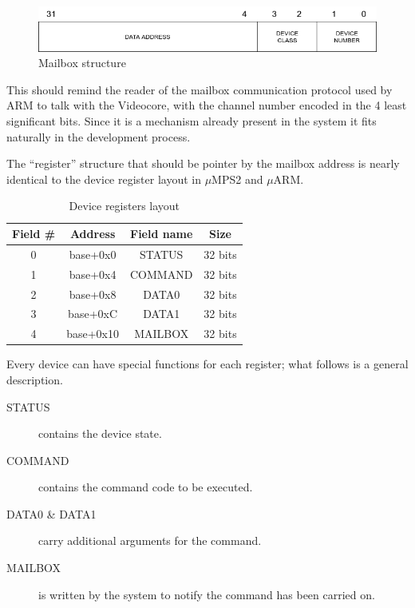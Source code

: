 \documentclass[12pt,a4paper,openright,twoside]{report}
\begin{document}
\begin{figure}[h]
\includegraphics[scale=0.571]{images/tesi5.png}
\caption[Mailbox Structure]{Mailbox structure}\label{fig:mailbox}
\end{figure}

This should remind the reader of the mailbox communication protocol used by ARM
to talk with the Videocore, with the channel number encoded in the 4 least significant
bits. Since it is a mechanism already present in the system it fits naturally
in the development process.

The ``register'' structure that should be pointer by the mailbox address is nearly 
identical to the device register layout in $\mu$MPS2 and $\mu$ARM.

\begin{table}[h]
\begin{center}
    \begin{tabular}{|c|c|c|c|}
    \hline
    \rowcolor[HTML]{C0C0C0} 
    Field \# & Address   & Field name & Size    \\ \hline
    0        & base+0x0  & STATUS     & 32 bits \\ \hline
    1        & base+0x4  & COMMAND    & 32 bits \\ \hline
    2        & base+0x8  & DATA0      & 32 bits \\ \hline
    3        & base+0xC  & DATA1      & 32 bits \\ \hline
    4        & base+0x10 & MAILBOX    & 32 bits \\ \hline
    \end{tabular}
 \caption[Device Registers Layout]{Device registers layout}\label{tab:reg}
\end{center}
\end{table}

Every device can have special functions for each register; what follows is a
general description.
\begin{description}
    \item[STATUS] contains the device state.
    \item[COMMAND] contains the command code to be executed.
    \item[DATA0 \& DATA1] carry additional arguments for the command.
    \item[MAILBOX] is written by the system to notify the command has been carried on.
\end{description}
\end{document}
